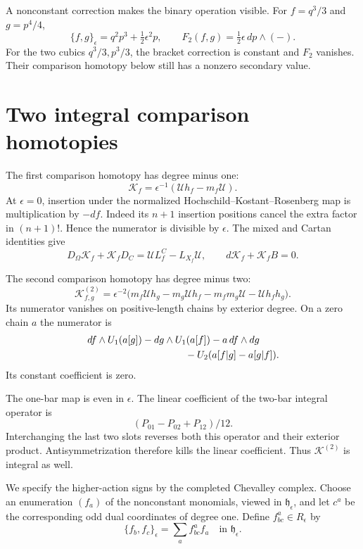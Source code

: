 A nonconstant correction makes the binary operation visible.
For $f=q^3/3$ and $g=p^4/4$,
\[
 \{f,g\}_\epsilon=q^2p^3+\tfrac12\epsilon^2p,
 \qquad F_2(f,g)=\tfrac12\epsilon\,dp\wedge(-).
\]
For the two cubics $q^3/3,p^3/3$, the bracket correction is
constant and $F_2$ vanishes. Their comparison homotopy below
still has a nonzero secondary value.

\section{Two integral comparison homotopies}

The first comparison homotopy has degree minus one:
\begin{equation}\label{mht:eq:cyclic-first-homotopy}
 \mathcal K_f
       =\epsilon^{-1}(\mathcal U h_f-m_f\mathcal U).
\end{equation}
At $\epsilon=0$, insertion under the normalized
Hochschild--Kostant--Rosenberg map is multiplication by $-df$.
Indeed its $n+1$ insertion positions cancel the extra factor
in $(n+1)!$. Hence the numerator is divisible by $\epsilon$.
The mixed and Cartan identities give
\[
 D_\Omega\mathcal K_f+\mathcal K_fD_C
     =\mathcal U L_f^C-L_{X_f}\mathcal U,
 \qquad d\mathcal K_f+\mathcal K_fB=0.
\]

The second comparison homotopy has degree minus two:
\begin{equation}\label{mht:eq:cyclic-second-homotopy}
 \mathcal K^{(2)}_{f,g}
 =\epsilon^{-2}
       \bigl(m_f\mathcal U h_g-m_g\mathcal U h_f
               -m_fm_g\mathcal U-\mathcal U h_fh_g\bigr).
\end{equation}
Its numerator vanishes on positive-length chains by exterior
degree. On a zero chain $a$ the numerator is
\begin{align*}
 &df\wedge\mathcal U_1(a[g])
   -dg\wedge\mathcal U_1(a[f])-a\,df\wedge dg\\
 &\hspace{35mm}-\mathcal U_2(a[f|g]-a[g|f]).
\end{align*}
Its constant coefficient is zero.

The one-bar map is even
in $\epsilon$. The linear coefficient of the two-bar
integral operator is
\[
 (P_{01}-P_{02}+P_{12})/12.
\]
Interchanging the last two slots reverses both this operator
and their exterior product. Antisymmetrization therefore
kills the linear coefficient. Thus
$\mathcal K^{(2)}$ is integral as well.

We specify the higher-action signs by the completed
Chevalley complex. Choose an enumeration $(f_a)$ of the
nonconstant monomials, viewed in $\mathfrak h_\epsilon$,
and let $c^a$ be the corresponding odd dual coordinates
of degree one. Define $f^a_{bc}\in R_\epsilon$ by
\[
 \{f_b,f_c\}_\epsilon=\sum_a f^a_{bc}f_a
 \quad\text{in }\mathfrak h_\epsilon.
\]

